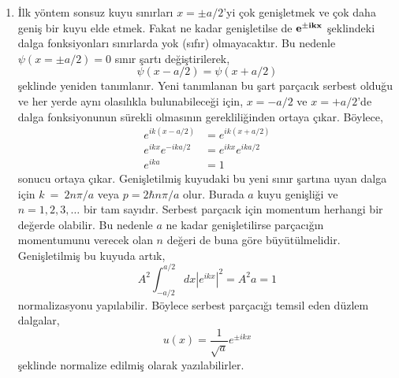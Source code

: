 \documentclass[00_kitap.tex]{subfiles}
\begin{document}
\begin{enumerate}
	\item İlk yöntem sonsuz kuyu sınırları $x=\pm a/2$'yi çok genişletmek ve çok daha geniş bir kuyu elde etmek. Fakat ne kadar genişletilse de $\bf e ^ { \pm i k x }$ şeklindeki dalga fonksiyonları sınırlarda yok (sıfır) olmayacaktır. Bu nedenle $\psi (x=\pm a / 2 ) = 0$ sınır şartı değiştirilerek,
	\begin{equation}
	\psi ( x-a/2) = \psi ( x + a/2 )
	\end{equation}
	şeklinde yeniden tanımlanır. Yeni tanımlanan bu şart parçacık serbest olduğu ve her yerde aynı olasılıkla bulunabileceği için, $x=-a/2$ ve $x=+a/2$'de  dalga fonksiyonunun sürekli olmasının gerekliliğinden ortaya çıkar. Böylece,
	\begin{align*}
	e ^ { i k (x-a/2) } &= e ^ { i k (x+a/2) }\\
	e ^ { i k x}	e ^ { -i k a/2}  &= e ^ { i k x } 	e ^ { i k a/2} \\
	e ^ { i k a} &= 1
	\end{align*}
	sonucu ortaya çıkar. Genişletilmiş kuyudaki bu yeni sınır şartına uyan dalga için $k~=~2 n \pi / a$ veya $p = 2 \hbar n \pi / a$ olur. Burada $a$ kuyu genişliği ve $n=1,2,3, \ldots$ bir tam sayıdır. Serbest parçacık için momentum herhangi bir değerde olabilir. Bu nedenle $a$ ne kadar genişletilirse parçacığın momentumunu verecek olan $n$ değeri de buna göre büyütülmelidir. Genişletilmiş bu kuyuda artık,
	\begin{equation}
	A ^ { 2 } \int _ { -a/2 } ^ { a/2 } d x \left| e ^ { i k x } \right| ^ { 2 } = A ^ { 2 } a = 1
	\end{equation}
	normalizasyonu yapılabilir. Böylece serbest parçacığı temsil eden düzlem dalgalar,
	\begin{equation}
	u(x) = \frac{1}{\sqrt{a}} e ^ { \pm i k x }
	\end{equation}
	şeklinde normalize edilmiş olarak yazılabilirler.
	

\end{enumerate}
\end{document}
